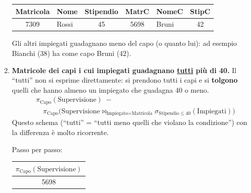 \documentclass[12pt]{extarticle}
\begin{document}
\begin{enumerate}
\begin{center}
    \medskip
    \small
    \begin{tabular}{clcclc}
        \toprule
        \textbf{Matricola} & \textbf{Nome} & \textbf{Stipendio} & \textbf{MatrC} & \textbf{NomeC} & \textbf{StipC} \\
        \midrule
        7309 & Rossi & 45 & 5698 & Bruni & 42 \\
        \bottomrule
    \end{tabular}
    \end{center}
    Gli altri impiegati guadagnano meno del capo (o quanto lui): ad esempio Bianchi (38) ha come capo Bruni (42).

    \item \textbf{Matricole dei capi i cui impiegati guadagnano \underline{tutti} più di 40.} Il ``tutti'' non si esprime direttamente: si prendono tutti i capi e si \textbf{tolgono} quelli che hanno almeno un impiegato che guadagna 40 o meno.
    \[
    \begin{aligned}
    & \pi_{\text{Capo}}(\text{Supervisione}) \; - \\
    & \quad \pi_{\text{Capo}}\big(\text{Supervisione} \bowtie_{\text{Impiegato} = \text{Matricola}} \sigma_{\text{Stipendio} \leq 40}(\text{Impiegati})\big)
    \end{aligned}
    \]
    Questo schema (``tutti'' = ``tutti meno quelli che violano la condizione'') con la differenza è molto ricorrente.
    \begin{center}
    \end{center}
    Passo per passo:
    \begin{center}
    \small
    \begin{tabular}{c}
        \toprule
        $\pi_{\text{Capo}}(\text{Supervisione})$ \\
        \midrule
        5698 \\

\end{tabular}
\end{center}
\end{enumerate}
\end{document}
